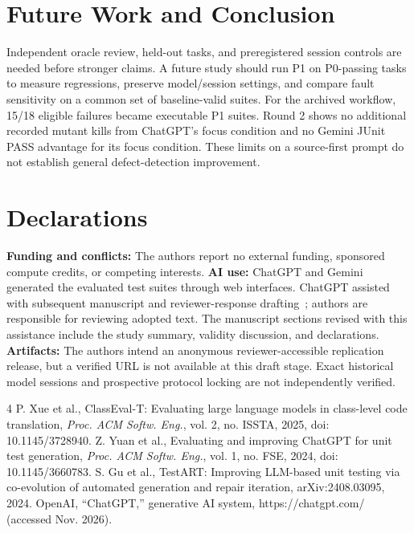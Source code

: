 \documentclass[conference]{IEEEtran}
\begin{document}
\section{Future Work and Conclusion}
Independent oracle review, held-out tasks, and preregistered session controls are needed before stronger claims. A future study should run P1 on P0-passing tasks to measure regressions, preserve model/session settings, and compare fault sensitivity on a common set of baseline-valid suites. For the archived workflow, 15/18 eligible failures became executable P1 suites. Round 2 shows no additional recorded mutant kills from ChatGPT's focus condition and no Gemini JUnit PASS advantage for its focus condition. These limits on a source-first prompt do not establish general defect-detection improvement.


\section*{Declarations}
\textbf{Funding and conflicts:} The authors report no external funding, sponsored compute credits, or competing interests. \textbf{AI use:} ChatGPT and Gemini generated the evaluated test suites through web interfaces. ChatGPT assisted with subsequent manuscript and reviewer-response drafting~\cite{chatgpttool}; authors are responsible for reviewing adopted text. The manuscript sections revised with this assistance include the study summary, validity discussion, and declarations. \textbf{Artifacts:} The authors intend an anonymous reviewer-accessible replication release, but a verified URL is not available at this draft stage. Exact historical model sessions and prospective protocol locking are not independently verified.

\begin{thebibliography}{4}
 P. Xue et al., ClassEval-T: Evaluating large language models in class-level code translation, \emph{Proc. ACM Softw. Eng.}, vol. 2, no. ISSTA, 2025, doi: 10.1145/3728940.
 Z. Yuan et al., Evaluating and improving ChatGPT for unit test generation, \emph{Proc. ACM Softw. Eng.}, vol. 1, no. FSE, 2024, doi: 10.1145/3660783.
 S. Gu et al., TestART: Improving LLM-based unit testing via co-evolution of automated generation and repair iteration, arXiv:2408.03095, 2024.
 OpenAI, ``ChatGPT,'' generative AI system, https://chatgpt.com/ (accessed Nov. 2026).
\end{thebibliography}
\end{document}
